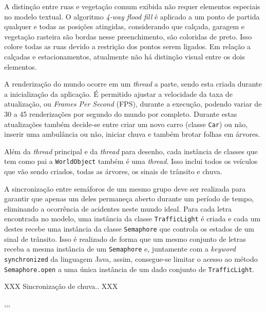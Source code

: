 A distinção entre ruas e vegetação comum exibida não requer elementos
especiais no modelo textual. O algoritmo \textit{4-way flood fill} é
aplicado a um ponto de partida qualquer e todas as posições atingidas,
considerando que calçada, garagem e vegetação rasteira são bordas
nesse preenchimento, são coloridas de preto. Isso colore todas as ruas
devido a restrição dos pontos serem ligados. Em relação a calçadas e
estacionamentos, atualmente não há distinção visual entre os dois
elementos.

A renderização do mundo ocorre em um \textit{thread} a parte, sendo
esta criada durante a inicialização da aplicação. É permitido ajustar
a velocidade da taxa de atualização, ou \textit{Frames Per Second} (FPS),
durante a execução, podendo variar de 30 a 45 renderizações por
segundo do mundo por completo. Durante estas atualizações também
decide-se entre criar um novo carro (classe \verb!Car!) ou não,
inserir uma ambulância ou não, iniciar chuva e também brotar folhas em
árvores.

Além da \textit{thread} principal e da \textit{thread} para desenho,
cada instância de classes que tem como pai a \verb!WorldObject! também
é uma \textit{thread}. Isso inclui todos os veículos que vão sendo
criados, todas as árvores, os sinais de trânsito e chuva.

A sincronização entre semáforos de um mesmo grupo deve ser realizada
para garantir que apenas um deles permaneça aberto durante um período
de tempo, eliminando a ocorrência de acidentes neste mundo ideal. Para
cada letra encontrada no modelo, uma instância da classe
\verb!TrafficLight! é criada e cada um destes recebe uma instância da
classe \verb!Semaphore! que controla os estados de um sinal de
trânsito. Isso é realizado de forma que um mesmo conjunto de letras
receba a mesma instância de um \verb!Semaphore! e, juntamente com a
\textit{keyword} \verb!synchronized! da linguagem Java, assim,
consegue-se limitar o acesso ao método \verb!Semaphore.open! a uma
única instância de um dado conjunto de \verb!TrafficLight!.

XXX Sincronização de chuva.. XXX

,,,
